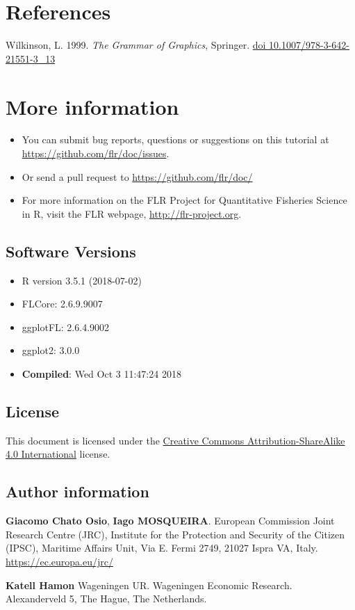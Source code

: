 \documentclass[]{article}
\providecommand{\tightlist}{%
  \setlength{\itemsep}{0pt}\setlength{\parskip}{0pt}}
\begin{document}
\section{References}\label{references}

Wilkinson, L. 1999. \emph{The Grammar of Graphics}, Springer.
\href{http://dx.doi.org/10.1007/978-3-642-21551-3_13}{doi
10.1007/978-3-642-21551-3\_13}

\section{More information}\label{more-information}

\begin{itemize}
\tightlist
\item
  You can submit bug reports, questions or suggestions on this tutorial
  at \url{https://github.com/flr/doc/issues}.
\item
  Or send a pull request to \url{https://github.com/flr/doc/}
\item
  For more information on the FLR Project for Quantitative Fisheries
  Science in R, visit the FLR webpage, \url{http://flr-project.org}.
\end{itemize}

\subsection{Software Versions}\label{software-versions}

\begin{itemize}
\tightlist
\item
  R version 3.5.1 (2018-07-02)
\item
  FLCore: 2.6.9.9007
\item
  ggplotFL: 2.6.4.9002
\item
  ggplot2: 3.0.0
\item
  \textbf{Compiled}: Wed Oct 3 11:47:24 2018
\end{itemize}

\subsection{License}\label{license}

This document is licensed under the
\href{https://creativecommons.org/licenses/by-sa/4.0}{Creative Commons
Attribution-ShareAlike 4.0 International} license.

\subsection{Author information}\label{author-information}

\textbf{Giacomo Chato Osio}, \textbf{Iago MOSQUEIRA}. European
Commission Joint Research Centre (JRC), Institute for the Protection and
Security of the Citizen (IPSC), Maritime Affairs Unit, Via E. Fermi
2749, 21027 Ispra VA, Italy. \url{https://ec.europa.eu/jrc/}

\textbf{Katell Hamon} Wageningen UR. Wageningen Economic Research.
Alexanderveld 5, The Hague, The Netherlands.
\end{document}
